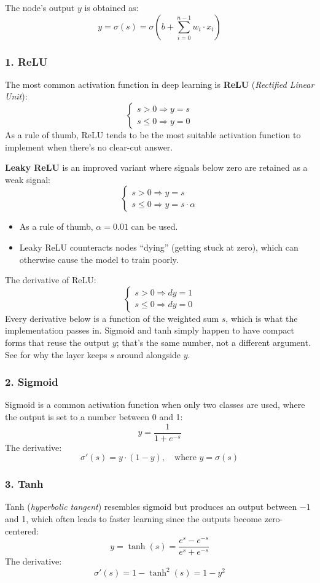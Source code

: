 \noindent The node's output $y$ is obtained as:
\[
  y = \sigma(s) = \sigma\!\left(b + \sum_{i=0}^{n-1} w_i \cdot x_i\right)
\]

\subsubsection{1. ReLU}
The most common activation function in deep learning is \textbf{ReLU} (\emph{Rectified Linear
Unit}):
\[
  \begin{cases} s > 0 \Rightarrow y = s \\ s \leq 0 \Rightarrow y = 0 \end{cases}
\]
As a rule of thumb, ReLU tends to be the most suitable activation function to implement when
there's no clear-cut answer.

\textbf{Leaky ReLU} is an improved variant where signals below zero are retained as a weak signal:
\[
  \begin{cases} s > 0 \Rightarrow y = s \\ s \leq 0 \Rightarrow y = s \cdot \alpha \end{cases}
\]
\begin{itemize}
  \item As a rule of thumb, $\alpha = 0.01$ can be used.
  \item Leaky ReLU counteracts nodes ``dying'' (getting stuck at zero), which can otherwise cause
    the model to train poorly.
\end{itemize}
The derivative of ReLU:
\[
  \begin{cases} s > 0 \Rightarrow dy = 1 \\ s \leq 0 \Rightarrow dy = 0 \end{cases}
\]
Every derivative below is a function of the weighted sum $s$, which is what the implementation
passes in. Sigmoid and tanh simply happen to have compact forms that reuse the output $y$; that's
the same number, not a different argument. See  for why the layer keeps $s$
around alongside $y$.

\subsubsection{2. Sigmoid}
Sigmoid is a common activation function when only two classes are used, where the output is set to
a number between 0 and 1:
\[
  y = \frac{1}{1 + e^{-s}}
\]
The derivative:
\[
  \sigma'(s) = y \cdot (1 - y), \quad \text{where } y = \sigma(s)
\]

\subsubsection{3. Tanh}
Tanh (\emph{hyperbolic tangent}) resembles sigmoid but produces an output between $-1$ and 1, which
often leads to faster learning since the outputs become zero-centered:
\[
  y = \tanh(s) = \frac{e^s - e^{-s}}{e^s + e^{-s}}
\]
The derivative:
\[
  \sigma'(s) = 1 - \tanh^2(s) = 1 - y^2
\]

